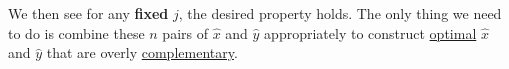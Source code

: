 \begin{eg}
\begin{intuition}
		We then see for any \textbf{fixed} \(j\), the desired property holds. The only thing we need to do is combine these \(n\) pairs of \(\hat{x}\) and \(\hat{y}\)
		appropriately to construct \hyperref[def:optimal-solution]{optimal} \(\hat{x}\) and \(\hat{y}\) that are overly \hyperref[def:complementary]{complementary}.
	\end{intuition}
\end{eg}